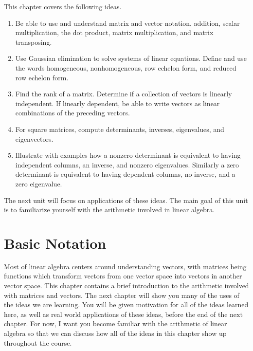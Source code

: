 
\noindent This chapter covers the following ideas. 

\begin{enumerate}

\item Be able to use and understand matrix and vector notation, addition, scalar multiplication, the dot product, matrix multiplication, and matrix transposing. 
\item Use Gaussian elimination to solve systems of linear equations. Define and use the words homogeneous, nonhomogeneous, row echelon form, and reduced row echelon form. 
\item Find the rank of a matrix. Determine if a collection of vectors is linearly independent. If linearly dependent, be able to write vectors as linear combinations of the preceding vectors.
\item For square matrices, compute determinants, inverses, eigenvalues, and eigenvectors. 
\item Illustrate with examples how a nonzero determinant is equivalent to having independent columns, an inverse, and nonzero eigenvalues. Similarly a zero determinant is equivalent to having dependent columns, no inverse, and a zero eigenvalue. 

\end{enumerate}

The next unit will focus on applications of these ideas. The main goal of this unit is to familiarize yourself with the arithmetic involved in linear algebra.


\section{Basic Notation}
Most of linear algebra centers around understanding vectors, with matrices being functions which transform vectors from one vector space into vectors in another vector space. This chapter contains a brief introduction to the arithmetic involved with matrices and vectors.  The next chapter will show you many of the uses of the ideas we are learning. You will be given motivation for all of the ideas learned here, as well as real world applications of these ideas, before the end of the next chapter.  For now, I want you become familiar with the arithmetic of linear algebra so that we can discuss how all of the ideas in this chapter show up throughout the course.

